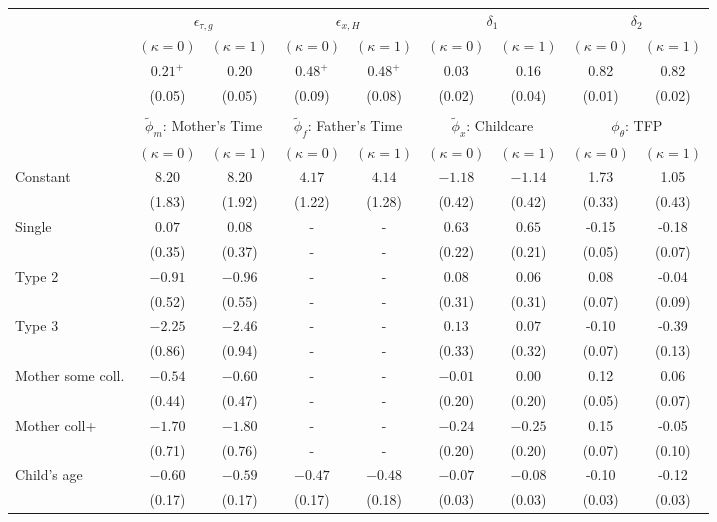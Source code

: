 \begin{tabular}{lcccccccc}\\\toprule
 & \multicolumn{2}{c}{$\epsilon_{\tau,g}$} & \multicolumn{2}{c}{$\epsilon_{x,H}$} & \multicolumn{2}{c}{$\delta_{1}$} & \multicolumn{2}{c}{$\delta_{2}$} \\
& $(\kappa=0)$ & $(\kappa=1)$ & $(\kappa=0)$ & $(\kappa=1)$ & $(\kappa=0)$ & $(\kappa=1)$ & $(\kappa=0)$ & $(\kappa=1)$ \\\cmidrule(r){2-3}\cmidrule(r){4-5}\cmidrule(r){6-7}\cmidrule(r){8-9}
&$0.21^{+}$&$0.20$&$0.48^{+}$&$0.48^{+}$&0.03&0.16&0.82&0.82\\
&(0.05)&(0.05)&(0.09)&(0.08)&(0.02)&(0.04)&(0.01)&(0.02)\\
&&&&&&&&\\
 & \multicolumn{2}{c}{$\tilde{\phi}_{m}$: Mother's Time} & \multicolumn{2}{c}{$\tilde{\phi}_{f}$: Father's Time} & \multicolumn{2}{c}{$\tilde{\phi}_{x}$: Childcare} & \multicolumn{2}{c}{$\phi_{\theta}$: TFP} \\
& $(\kappa=0)$ & $(\kappa=1)$ & $(\kappa=0)$ & $(\kappa=1)$ & $(\kappa=0)$ & $(\kappa=1)$ & $(\kappa=0)$ & $(\kappa=1)$ \\\cmidrule(r){2-3}\cmidrule(r){4-5}\cmidrule(r){6-7}\cmidrule(r){8-9}
Constant&$8.20$&$8.20$&$4.17$&$4.14$&$-1.18$&$-1.14$&1.73&1.05\\
&(1.83)&(1.92)&(1.22)&(1.28)&(0.42)&(0.42)&(0.33)&(0.43)\\
Single&$0.07$&$0.08$&-&-&$0.63$&$0.65$&-0.15&-0.18\\
&(0.35)&(0.37)&-&-&(0.22)&(0.21)&(0.05)&(0.07)\\
Type 2&$-0.91$&$-0.96$&-&-&$0.08$&$0.06$&0.08&-0.04\\
&(0.52)&(0.55)&-&-&(0.31)&(0.31)&(0.07)&(0.09)\\
Type 3&$-2.25$&$-2.46$&-&-&$0.13$&$0.07$&-0.10&-0.39\\
&(0.86)&(0.94)&-&-&(0.33)&(0.32)&(0.07)&(0.13)\\
Mother some coll.&$-0.54$&$-0.60$&-&-&$-0.01$&$0.00$&0.12&0.06\\
&(0.44)&(0.47)&-&-&(0.20)&(0.20)&(0.05)&(0.07)\\
Mother coll+&$-1.70$&$-1.80$&-&-&$-0.24$&$-0.25$&0.15&-0.05\\
&(0.71)&(0.76)&-&-&(0.20)&(0.20)&(0.07)&(0.10)\\
Child's age&$-0.60$&$-0.59$&$-0.47$&$-0.48$&$-0.07$&$-0.08$&-0.10&-0.12\\
&(0.17)&(0.17)&(0.17)&(0.18)&(0.03)&(0.03)&(0.03)&(0.03)\\

\end{tabular}
